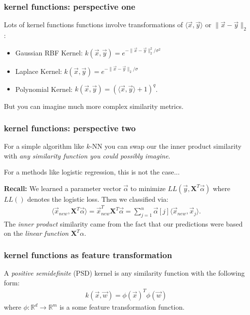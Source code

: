 \documentclass[handout,compress]{beamer}
\newcommand{\bv}[1]{\mathbf{#1}}
\newcommand{\R}{\mathbb{R}}
\begin{document}
\begin{frame}
	\frametitle{kernel functions: perspective one}
	Lots of kernel functions functions involve transformations of $\langle \vec{x},\vec{y}\rangle$ or $\|\vec{x} - \vec{y}\|_2$:
	\begin{itemize}
		\item Gaussian RBF Kernel: $k(\vec{x}, \vec{y}) = e^{-\|\vec{x} - \vec{y}\|_2^2/\sigma^2}$
		\item Laplace Kernel: $k(\vec{x}, \vec{y}) = e^{-\|\vec{x} - \vec{y}\|_2/\sigma}$
		\item Polynomial Kernel: $k(\vec{x}, \vec{y}) = (\langle \vec{x},\vec{y}\rangle + 1)^q$.
	\end{itemize}
But you can imagine much more complex similarity metrics. 
\end{frame}

\begin{frame} 
	\frametitle{kernel functions: perspective two}
	For a simple algorithm like $k$-NN you can swap our the inner product similarity with \emph{any similarity function you could possibly imagine}. 
	
	For a methods like logistic regression, this is not the case... 
	
	\textbf{Recall:} We learned a parameter vector $\vec{\alpha}$ to minimize $LL(\vec{y}, \bv{X}^T\vec{\alpha})$ where $LL()$ denotes the logistic loss. Then we classified via:
	\begin{align*}
	\langle\vec{x}_{new}, \bv{X}^T\vec{\alpha}\rangle =\vec{x}_{new}^T \bv{X}^T\vec{\alpha} 
	= \sum_{j=1}^n \vec{\alpha}[j] \langle\vec{x}_{new}, \vec{x}_j\rangle.
	\end{align*}
	The \emph{inner product} similarity came from the fact that our predictions were based on the \emph{linear function} $\bv{X}^T \alpha$.	
\end{frame}

\begin{frame} 
	\frametitle{kernel functions as feature transformation}
	A \emph{positive semidefinite} (PSD) kernel is any similarity function with the following form:
	\begin{align*}
	k(\vec{x},\vec{w}) = \phi(\vec{x})^T \phi(\vec{w})
	\end{align*}
	where $\phi: \R^d \rightarrow \R^m$ is a some feature transformation function. 
\end{frame}
\end{document}
